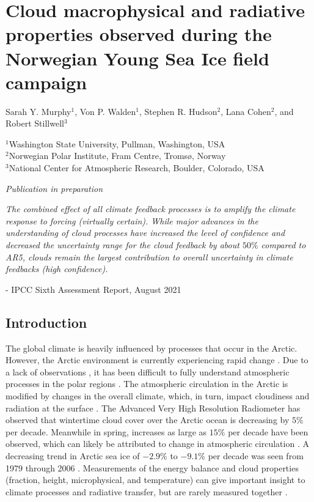 \chapter{Cloud macrophysical and radiative properties observed during the Norwegian Young Sea Ice field campaign}
\bigskip
\noindent Sarah Y. Murphy$^1$, Von P. Walden$^1$, Stephen R. Hudson$^2$, Lana Cohen$^2$, and Robert Stillwell$^3$ \bigskip

\noindent $^1$Washington State University, Pullman, Washington, USA\\
$^2$Norwegian Polar Institute, Fram Centre, Tromsø, Norway\\
$^3$National Center for Atmospheric Research, Boulder, Colorado, USA

\begin{center}
    \emph{Publication in preparation}
\end{center}

\bigskip
\bigskip
\noindent \emph{The combined effect of all climate feedback processes is to amplify the climate response to forcing (virtually certain). While major advances in the understanding of cloud processes have increased the level of confidence and decreased the uncertainty range for the cloud feedback by about $50\%$ compared to AR5, clouds remain the largest contribution to overall uncertainty in climate feedbacks (high confidence).}

\hspace{6 cm} - IPCC Sixth Assessment Report, August 2021

\section{Introduction}

The global climate is heavily influenced by processes that occur in the Arctic. However, the Arctic environment is currently experiencing rapid change \cite{overland:2011, stroeve:2007}. Due to a lack of observations , it has been difficult to fully understand atmospheric processes in the polar regions \cite{persson:2002}. The atmospheric circulation in the Arctic is modified by changes in the overall climate, which, in turn, impact cloudiness and radiation at the surface \cite{zhang:2008}. The Advanced Very High Resolution Radiometer has observed that wintertime cloud cover over the Arctic ocean is decreasing by $5 \%$ per decade. Meanwhile in spring, increases as large as $15 \%$ per decade have been observed, which can likely be attributed to change in atmospheric circulation \cite{schweiger:2004}. A decreasing trend in Arctic sea ice of $-2.9 \%$ to $-9.1 \%$ per decade was seen from 1979 through 2006 \cite{stroeve:2007}. Measurements of the energy balance and cloud properties (fraction, height, microphysical, and temperature) can give important insight to climate processes and radiative transfer, but are rarely measured together \cite{persson:2002, schweiger:2004, miller:2017}. 

